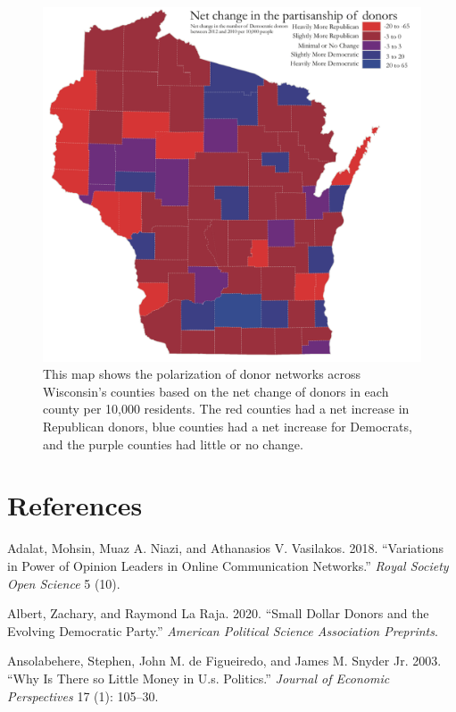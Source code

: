 \documentclass[12pt,]{article}
\begin{document}
\begin{figure}
\includegraphics[width=0.9\linewidth]{../figures/fig5} \caption{This map shows the polarization of donor networks across Wisconsin's counties based on the net change of donors in each county per 10,000 residents. The red counties had a net increase in Republican donors, blue counties had a net increase for Democrats, and the purple counties had little or no change.}\label{fig:unnamed-chunk-15}
\end{figure}

\newpage

\hypertarget{references}{%
\section*{References}\label{references}}

\hypertarget{refs}{}
\leavevmode\hypertarget{ref-adalat2018}{}%
Adalat, Mohsin, Muaz A. Niazi, and Athanasios V. Vasilakos. 2018.
``Variations in Power of Opinion Leaders in Online Communication
Networks.'' \emph{Royal Society Open Science} 5 (10).

\leavevmode\hypertarget{ref-albert2020}{}%
Albert, Zachary, and Raymond La Raja. 2020. ``Small Dollar Donors and
the Evolving Democratic Party.'' \emph{American Political Science
Association Preprints}.

\leavevmode\hypertarget{ref-ansolabehere2003}{}%
Ansolabehere, Stephen, John M. de Figueiredo, and James M. Snyder Jr.
2003. ``Why Is There so Little Money in U.s. Politics.'' \emph{Journal
of Economic Perspectives} 17 (1): 105--30.
\end{document}
